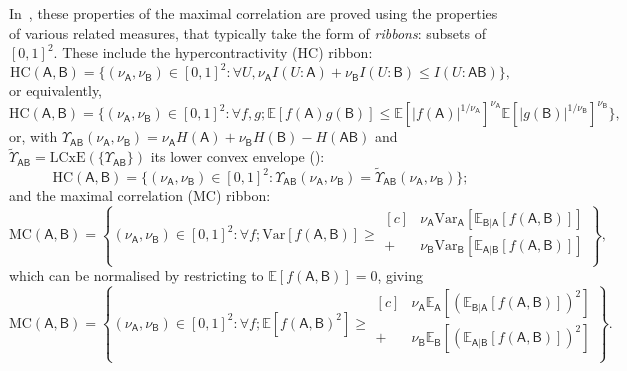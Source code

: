 \documentclass[10pt, a4paper]{article}
\numberwithin{equation}{section} %
\theoremstyle{definition}
\theoremstyle{plain}
\newcommand{\abs}[1]{\left\lvert#1\right\rvert}
\newcommand{\st}{\mathrel{:}} %
\newcommand{\?}{\mathrel{?}} %
\newcommand{\E}{\mathbb{E}} %
\newcommand{\Var}{\mathrm{Var}} %
\newcommand{\crv}[1]{\mathsf{#1}}
\newcommand{\LCxE}[1]{\mathrm{LCxE}\left(#1\right)}
\newcommand{\HC}{\mathrm{HC}}
\newcommand{\MC}{\mathrm{MC}}
\begin{document}
    In~\cite{NLMonotones}, these properties of the maximal correlation are proved using the properties of various related measures, that typically take the form of \emph{ribbons}: subsets of \({[0,1]}^2\). These include the hypercontractivity (HC) ribbon:
    \begin{equation}
      \HC(\crv{A},\crv{B}) = \{(\nu_{\crv{A}}, \nu_{\crv{B}}) \in {[0,1]}^2 \st \forall U, \nu_{\crv{A}} I(U:\crv{A}) + \nu_{\crv{B}} I(U:\crv{B}) \leq I(U:\crv{AB})\},
    \end{equation}
    or equivalently,
    \begin{equation}
      \HC(\crv{A},\crv{B}) = \{(\nu_{\crv{A}}, \nu_{\crv{B}}) \in {[0,1]}^2 \st \forall f,g; \E[f(\crv{A})g(\crv{B})] \leq {\E[\abs{f(\crv{A})}^{1/\nu_{\crv{A}}}]}^{\nu_{\crv{A}}} {\E[\abs{g(\crv{B})}^{1/\nu_{\crv{B}}}]}^{\nu_{\crv{B}}} \},
    \end{equation}
    or, with \(\Upsilon_{\crv{AB}}(\nu_{\crv{A}}, \nu_{\crv{B}}) = \nu_{\crv{A}} H(\crv{A}) + \nu_{\crv{B}} H(\crv{B}) - H(\crv{AB})\) and \(\tilde{\Upsilon}_{\crv{AB}} = \LCxE{\{\Upsilon_{\crv{AB}}\}}\) its lower convex envelope ():
    \begin{equation}
      \HC(\crv{A},\crv{B}) = \{(\nu_{\crv{A}}, \nu_{\crv{B}}) \in {[0,1]}^2 \st \Upsilon_{\crv{AB}}(\nu_{\crv{A}}, \nu_{\crv{B}}) = \tilde{\Upsilon}_{\crv{AB}}(\nu_{\crv{A}}, \nu_{\crv{B}}) \};
    \end{equation}
    and the maximal correlation (MC) ribbon:
    \begin{equation}
      \MC(\crv{A},\crv{B}) = \left\{ 
        (\nu_{\crv{A}}, \nu_{\crv{B}}) \in {[0,1]}^2 \st \forall f; \Var[f(\crv{A},\crv{B})] \geq 
        \begin{aligned}[c]
          & \nu_{\crv{A}} \Var_{\crv{A}}[\E_{\crv{B}|\crv{A}}[f(\crv{A},\crv{B})]] \\
          + & \nu_{\crv{B}} \Var_{\crv{B}}[\E_{\crv{A}|\crv{B}}[f(\crv{A},\crv{B})]] \\
        \end{aligned}
      \right\},
    \end{equation}
    which can be normalised by restricting to \(\E[f(\crv{A},\crv{B})] = 0\), giving
    \begin{equation}
      \MC(\crv{A},\crv{B}) = \left\{(\nu_{\crv{A}}, \nu_{\crv{B}}) \in {[0,1]}^2 \st \forall f; \E[{f(\crv{A},\crv{B})}^2] \geq 
        \begin{aligned}[c]
          & \nu_{\crv{A}} \E_{\crv{A}}[{(\E_{\crv{B}|\crv{A}}[f(\crv{A},\crv{B})])}^2] \\ + & \nu_{\crv{B}} \E_{\crv{B}}[{(\E_{\crv{A}|\crv{B}}[f(\crv{A},\crv{B})])}^2] \\
        \end{aligned}
      \right\}.
    \end{equation}
\end{document}
